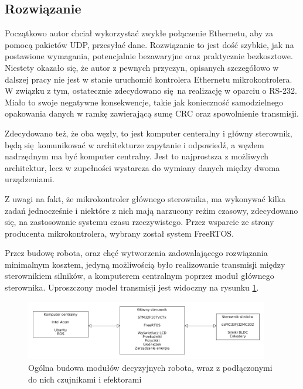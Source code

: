 \documentclass[a4paper, 12pt]{article}
\begin{document}
	\subsection{Rozwiązanie}
	Początkowo autor chciał wykorzystać zwykłe połączenie Ethernetu, aby za pomocą pakietów UDP, przesyłać dane. Rozwiązanie to jest dość szybkie, jak na postawione wymagania, potencjalnie bezawaryjne oraz praktycznie bezkosztowe. Niestety okazało się, że autor z pewnych przyczyn, opisanych szczegółowo w dalszej pracy nie jest w stanie uruchomić kontrolera Ethernetu mikrokontrolera. W związku z tym, ostatecznie zdecydowano się na realizację w oparciu o RS-232. Miało to swoje negatywne konsekwencje, takie jak konieczność samodzielnego opakowania danych w ramkę zawierającą sumę CRC oraz spowolnienie transmisji.\par Zdecydowano też, że oba węzły, to jest komputer centeralny i główny sterownik, będą się komunikować w architekturze zapytanie i odpowiedź, a węzłem nadrzędnym ma być komputer centralny. Jest to najprostsza z możliwych architektur, lecz w zupełności wystarcza do wymiany danych między dwoma urządzeniami.\par Z uwagi na fakt, że mikrokontroler głównego sterownika, ma wykonywać kilka zadań jednocześnie i niektóre z nich mają narzucony reżim czasowy, zdecydowano się, na zastosowanie systemu czasu rzeczywistego. Przez wsparcie ze strony producenta mikrokontrolera, wybrany został system FreeRTOS.\par Przez budowę robota, oraz chęć wytworzenia zadowalającego rozwiązania minimalnym kosztem, jedyną możliwością było realizowanie transmisji między sterownikiem silników, a komputerem centralnym poprzez moduł głównego sterownika. Uproszczony model transmisji jest widoczny na rysunku \ref{img:budowaOgolna}.
	\begin{figure}[ht]
	    \centering
	    \includegraphics[width=0.95\textwidth]{budowa_ogolna}
	    \caption{Ogólna budowa modułów decyzyjnych robota, wraz z podłączonymi do nich czujnikami i efektorami}
	    \label{img:budowaOgolna}
	\end{figure}
\end{document}
